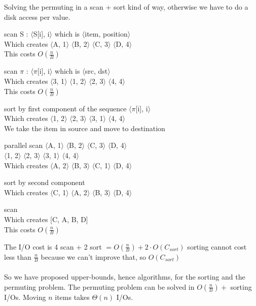 \documentclass[10pt]{report}
\begin{document}
Solving the permuting in a scan + sort kind of way, otherwise we have to do a disk access per value.\\
\begin{list}{}{}
	\item scan S : $\langle$S[i], i$\rangle$ which is $\langle$item, position$\rangle$\\
	Which creates $\langle$A, 1$\rangle$ $\langle$B, 2$\rangle$ $\langle$C, 3$\rangle$ $\langle$D, 4$\rangle$\\
	This costs $O(\frac{n}{B})$
	\item scan $\pi$ : $\langle\pi$[i], i$\rangle$ which is $\langle$src, dst$\rangle$\\
	Which creates $\langle$3, 1$\rangle$ $\langle$1, 2$\rangle$ $\langle$2, 3$\rangle$ $\langle$4, 4$\rangle$\\
	This costs $O(\frac{n}{B})$
	\item sort by first component of the sequence $\langle\pi$[i], i$\rangle$\\
	Which creates $\langle$1, 2$\rangle$ $\langle$2, 3$\rangle$ $\langle$3, 1$\rangle$ $\langle$4, 4$\rangle$\\
	We take the item in source and move to destination
	\item parallel scan
	$\langle$A, 1$\rangle$ $\langle$B, 2$\rangle$ $\langle$C, 3$\rangle$ $\langle$D, 4$\rangle$\\
	$\langle$1, 2$\rangle$ $\langle$2, 3$\rangle$ $\langle$3, 1$\rangle$ $\langle$4, 4$\rangle$\\
	Which creates $\langle$A, 2$\rangle$ $\langle$B, 3$\rangle$ $\langle$C, 1$\rangle$ $\langle$D, 4$\rangle$\\
	\item sort by second component\\
	Which creates $\langle$C, 1$\rangle$ $\langle$A, 2$\rangle$ $\langle$B, 3$\rangle$ $\langle$D, 4$\rangle$\\
	\item scan\\
	Which creates [C, A, B, D]\\
	This costs $O(\frac{n}{B})$
\end{list}
The I/O cost is 4 scan + 2 sort $= O(\frac{n}{B}) + 2\cdot O(C_{sort})$ sorting cannot cost less than $\frac{n}{B}$ because we can't improve that, so $O(C_{sort})$\\\\
So we have proposed upper-bounds, hence algorithms, for the sorting and the permuting problem. The permuting problem can be solved in $O(\frac{n}{B}) +$ sorting I/Os. Moving $n$ items takes $\Theta(n)$ I/Os.\\
\end{document}
